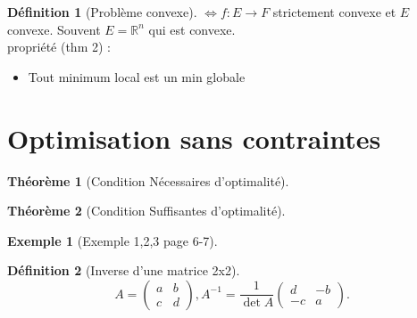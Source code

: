 \documentclass{article}
\theoremstyle{plain}%
\newtheorem{thm}{Théorème}[section]
\theoremstyle{definition}
\newtheorem{defn}{Définition}[section]
\newtheorem{exmp}{Exemple}[section]
\begin{document}
\begin{defn}[Problème convexe]
    $ \Leftrightarrow f: E \to F $ strictement convexe et $ E $ convexe. Souvent $ E=\mathbb{R}^n $ qui est convexe. \\
    propriété (thm 2) : \begin{itemize}
        \item Tout minimum local est un min globale 
    \end{itemize}
\end{defn}


\section{Optimisation sans contraintes}
\begin{thm}[Condition Nécessaires d'optimalité]
    
\end{thm}

\begin{thm}[Condition Suffisantes d'optimalité]
    
\end{thm}

\begin{exmp}[Exemple 1,2,3 page 6-7]
    
\end{exmp}

\begin{defn}[Inverse d'une matrice 2x2]
    \[
        A = \begin{pmatrix}
            a & b \\
            c & d
        \end{pmatrix}, A^{-1} = \frac{1}{\det A} \begin{pmatrix}
            d & -b \\
            -c & a
        \end{pmatrix}
    .\]
\end{defn}
\end{document}
